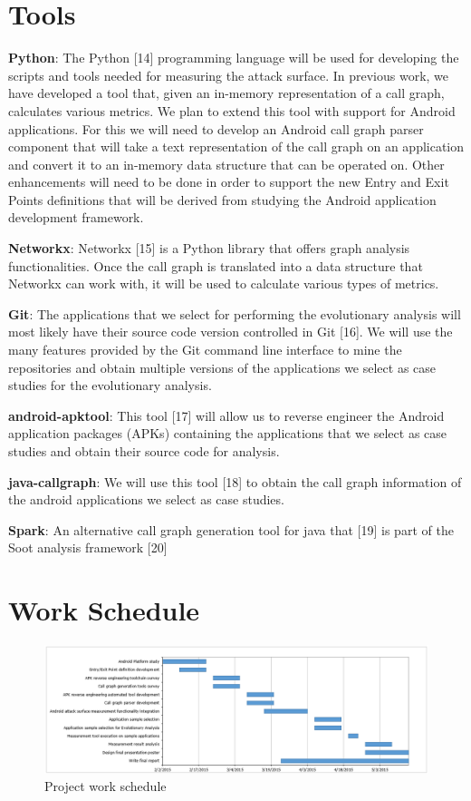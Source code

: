 \documentclass[conference]{IEEEtran}
\begin{document}
\section{Tools}

\textbf{Python}: The Python [14] programming language will be used for developing the scripts and tools needed for measuring the attack surface. In previous work, we have developed a tool that, given an in-memory representation of a call graph, calculates various metrics. We plan to extend this tool with support for Android applications. For this we will need to develop an Android call graph parser component that will take a text representation of the call graph on an application and convert it to an in-memory data structure that can be operated on. Other enhancements will need to be done in order to support the new Entry and Exit Points definitions that will be derived from studying the Android application development framework.

\textbf{Networkx}: Networkx [15] is a Python library that offers graph analysis functionalities. Once the call graph is translated into a data structure that Networkx can work with, it will be used to calculate various types of metrics.

\textbf{Git}: The applications that we select for performing the evolutionary analysis will most likely have their source code version controlled in Git [16]. We will use the many features provided by the Git command line interface to mine the repositories and obtain multiple versions of the applications we select as case studies for the evolutionary analysis.

\textbf{android-apktool}: This tool [17] will allow us to reverse engineer the Android application packages (APKs) containing the applications that we select as case studies and obtain their source code for analysis.

\textbf{java-callgraph}: We will use this tool [18] to obtain the call graph information of the android applications we select as case studies.

\textbf{Spark}: An alternative call graph generation tool for java that [19] is part of the Soot analysis framework [20]

\section{Work Schedule}

\begin{figure}
  \centering
  \includegraphics[scale=0.45]{figs/schedule.png}
  \caption{Project work schedule}
  \label{fig:schedule}
\end{figure}
\end{document}
